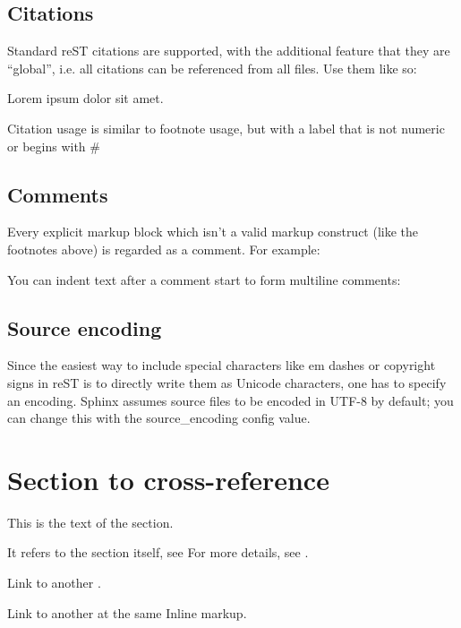 \documentclass[letterpaper,10pt,english]{sphinxmanual}
\begin{document}
\section{Citations}
\label{\detokenize{usage/introduction:citations}}
Standard reST citations are supported, with the additional feature that they are “global”, i.e. all citations can be referenced from all files. Use them like so:

Lorem ipsum \label{\detokenize{usage/introduction:id1}}{\hyperref[\detokenize{usage/introduction:ref}]{\sphinxcrossref{{[}Ref{]}}}} dolor sit amet.

Citation usage is similar to footnote usage, but with a label that is not numeric or begins with \#


\section{Comments}
\label{\detokenize{usage/introduction:comments}}
Every explicit markup block which isn’t a valid markup construct (like the footnotes above) is regarded as a comment. For example:

You can indent text after a comment start to form multiline comments:


\section{Source encoding}
\label{\detokenize{usage/introduction:source-encoding}}
Since the easiest way to include special characters like em dashes or copyright signs in reST is to directly write them as Unicode characters,
one has to specify an encoding. Sphinx assumes source files to be encoded in UTF-8 by default;
you can change this with the source\_encoding config value.


\chapter{Section to cross-reference}
\label{\detokenize{usage/introduction:section-to-cross-reference}}
This is the text of the section.

It refers to the section itself, see For more details, see {\hyperref[\detokenize{usage/introduction:introduction}]{}}.

Link to another {\hyperref[\detokenize{usage/introduction:inline-markup}]{}}.

Link to another {\hyperref[\detokenize{usage/introduction:inline-markup}]{}} at the same Inline markup.
\end{document}
